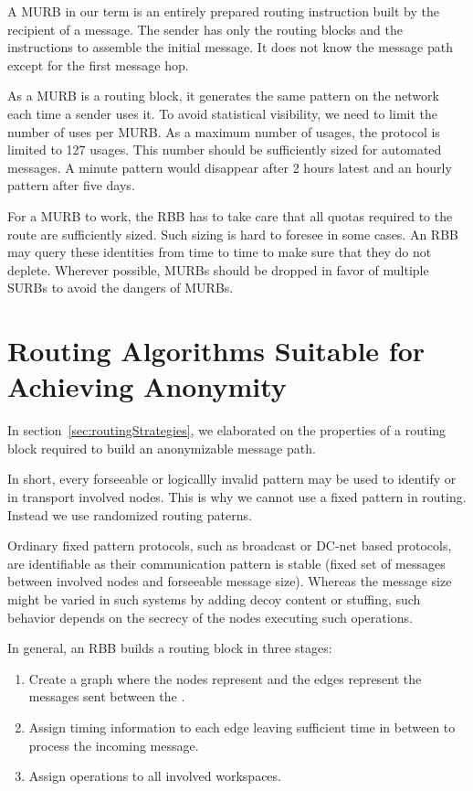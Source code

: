 A MURB in our term is an entirely prepared routing instruction built by the recipient of a message. The sender has only the routing blocks and the instructions to assemble the initial message. It does not know the message path except for the first message hop.

As a MURB is a routing block, it generates the same pattern on the network each time a sender uses it. To avoid statistical visibility, we need to limit the number of uses per MURB. As a maximum number of usages, the protocol is limited to 127 usages. This number should be sufficiently sized for automated messages. A minute pattern would disappear after 2 hours latest and an hourly pattern after five days.

For a MURB to work, the RBB has to take care that all quotas required to the route are sufficiently sized. Such sizing is hard to foresee in some cases. An RBB may query these identities from time to time to make sure that they do not deplete. Wherever possible, MURBs should be dropped in favor of multiple SURBs to avoid the dangers of MURBs.

\section{Routing Algorithms Suitable for Achieving Anonymity\label{sec:routingStrategies}}
In section~\ref{sec:routingStrategies}, we elaborated on the properties of a routing block required to build an anonymizable message path.

In short, every forseeable or logicallly invalid pattern may be used to identify \VortexMessages{} or in transport involved nodes. This is why we cannot use a fixed pattern in routing. Instead we use randomized routing paterns. 

Ordinary fixed pattern protocols, such as broadcast or DC-net based protocols, are identifiable as their communication pattern is stable (fixed set of messages between involved nodes and forseeable message size). Whereas the message size might be varied in such systems by adding decoy content or stuffing, such behavior depends on the secrecy of the nodes executing such operations.

In general, an RBB builds a routing block in three stages:
\begin{enumerate}
	\item Create a graph where the nodes represent \VortexNodes and the edges represent the messages sent between the \VortexNodes.
	\item Assign timing information to each edge leaving sufficient time in between to process the incoming message.
	\item Assign operations to all involved workspaces.
\end{enumerate}


